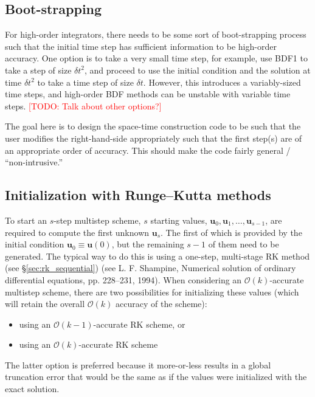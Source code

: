 \documentclass[a4paper,12pt]{article}
\makeatletter
\newcommand{\todo}[1]{\textcolor{red}{[TODO\@: #1]}}
\makeatother
\begin{document}
\subsection{Boot-strapping}

For high-order integrators, there needs to be some sort of boot-strapping process such that the initial time step has sufficient
information to be high-order accuracy. One option is to take a very small time step, for example, use BDF1 to take a step of
size $\delta t^2$, and proceed to use the initial condition and the solution at time $\delta t^2$ to take a time step of size 
$\delta t$. However, this introduces a variably-sized time steps, and high-order BDF methods can be unstable with variable
time steps. \todo{Talk about other options?}

The goal here is to design the space-time construction code to be such that the user modifies the right-hand-side appropriately
such that the first step(s) are of an appropriate order of accuracy. This should make the code fairly general / ``non-intrusive.'' 


\subsection{Initialization with Runge--Kutta methods}
To start an $s$-step multistep scheme, $s$ starting values, $\mathbf{u}_0, \mathbf{u}_1, \dots, \mathbf{u}_{s-1}$, are required to compute the first unknown $\mathbf{u}_s$. The first of which is provided by the initial condition $\mathbf{u}_0 \equiv \mathbf{u}(0)$, but the remaining $s-1$ of them need to be generated. The typical way to do this is using a one-step, multi-stage RK method (see \S \ref{sec:rk_sequential}) (see L. F. Shampine, Numerical solution of ordinary differential equations, pp. 228--231, 1994). When considering an $\mathcal{O}(k)$-accurate multistep scheme, there are two possibilities for initializing these values (which will retain the overall $\mathcal{O}(k)$ accuracy of the scheme):
\begin{itemize}
\item using an $\mathcal{O}(k-1)$-accurate RK scheme, or
\item using an $\mathcal{O}(k)$-accurate RK scheme
\end{itemize}
The latter option is preferred because it more-or-less results in a global truncation error that would be the same as if the values were initialized with the exact solution.
\end{document}
